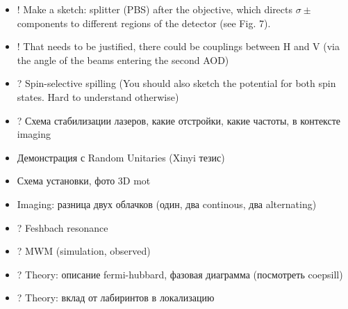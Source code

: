 \begin{itemize}
	\item ! Make a sketch:  splitter (PBS) after the objective, which directs $\sigma\pm$ components to different regions of the detector (see Fig. 7).
	\item ! That needs to be justified, there could be couplings between H and V (via the angle of the beams entering the second AOD)
	\item ? Spin-selective spilling (You should also sketch the potential for both spin states. Hard to understand otherwise)
	\item ? Схема стабилизации лазеров, какие отстройки, какие частоты, в контексте imaging
	\item Демонстрация с Random Unitaries (Xinyi тезис)
	\item Схема установки, фото 3D mot
	\item Imaging: разница двух облачков (один, два continous, два alternating)
	\item ? Feshbach resonance
	\item ? MWM (simulation, observed)
	\item ? Theory: описание fermi-hubbard, фазовая диаграмма (посмотреть coepsill)
	\item ? Theory: вклад от лабиринтов в локализацию
\end{itemize}









